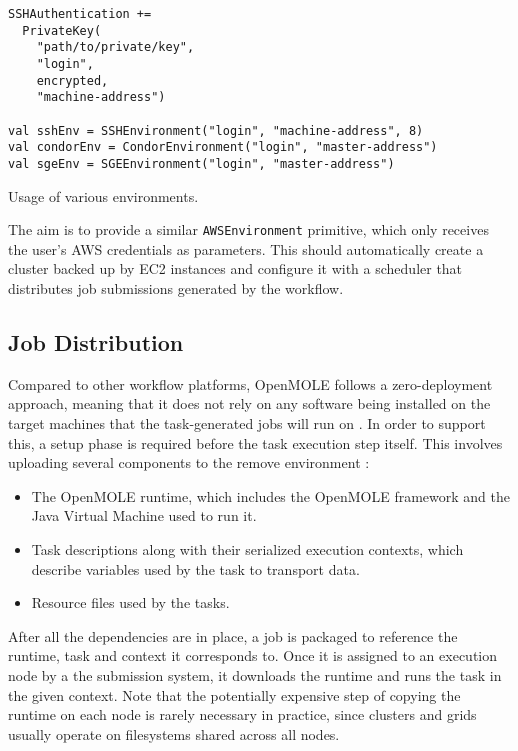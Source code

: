 \begin{listing}[h]
	\centering
	\begin{minipage}{11.5cm}
		\begin{verbatim}
SSHAuthentication += 
  PrivateKey(
    "path/to/private/key",
    "login",
    encrypted, 
    "machine-address")

val sshEnv = SSHEnvironment("login", "machine-address", 8)
val condorEnv = CondorEnvironment("login", "master-address")
val sgeEnv = SGEEnvironment("login", "master-address")
		\end{verbatim}
	\end{minipage}
	\caption{Usage of various environments.}
	\label{Environments}
\end{listing}

The aim is to provide a similar \verb|AWSEnvironment| primitive, which only receives the user's AWS credentials as parameters. This should automatically create a cluster backed up by EC2 instances and configure it with a scheduler that distributes job submissions generated by the workflow.

\subsection{Job Distribution}

Compared to other workflow platforms, OpenMOLE follows a zero-deployment approach, meaning that it does not rely on any software being installed on the target machines that the task-generated jobs will run on \cite{Reuillon2013}. In order to support this, a setup phase is required before the task execution step itself. This involves uploading several components to the remove environment \cite{Reuillon2010}:

\begin{itemize}
	\item The OpenMOLE runtime, which includes the OpenMOLE framework and the Java Virtual Machine used to run it.
	\item Task descriptions along with their serialized execution contexts, which describe variables used by the task to transport data.
	\item Resource files used by the tasks.
\end{itemize}

After all the dependencies are in place, a job is packaged to reference the runtime, task and context it corresponds to. Once it is assigned to an execution node by a the submission system, it downloads the runtime and runs the task in the given context. Note that the potentially expensive step of copying the runtime on each node is rarely necessary in practice, since clusters and grids usually operate on filesystems shared across all nodes.


